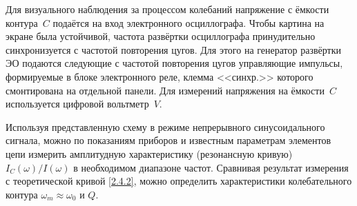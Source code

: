 Для визуального наблюдения за процессом колебаний напряжение с ёмкости 
контура~$C$ подаётся на вход электронного осциллографа. Чтобы картина на 
экране была устойчивой, частота развёртки осциллографа принудительно 
синхронизуется с частотой повторения цугов. Для этого на генератор 
развёртки ЭО подаются следующие с частотой повторения цугов управляющие 
импульсы, формируемые в блоке электронного реле, клемма <<синхр.>> которого 
смонтирована на отдельной панели. Для измерений напряжения на ёмкости~$C$ 
используется цифровой вольтметр~$V$.

Используя представленную схему в режиме непрерывного синусоидального 
сигнала, можно по показаниям приборов и известным параметрам элементов 
цепи измерить амплитудную характеристику (резонансную кривую) 
$I_C(\omega)/I(\omega)$ в необходимом диапазоне частот. 
Сравнивая результат измерения с теоретической кривой \eqref{2.4.2}, можно 
определить характеристики колебательного контура $\omega_m\approx \omega_0$ и $Q$.
 
